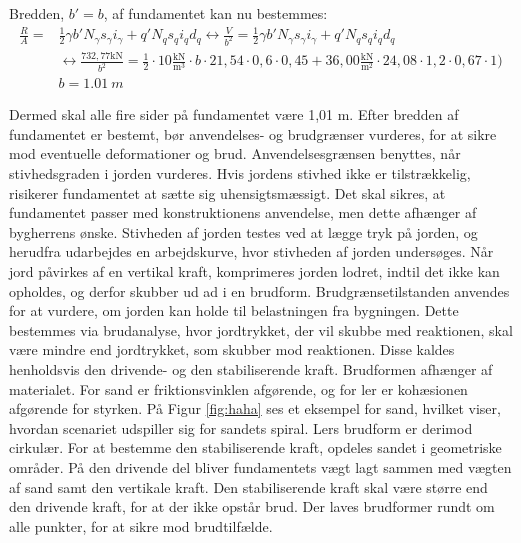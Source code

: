 Bredden, $b'=b$, af fundamentet kan nu bestemmes: 
\begin{equation}
\begin{split}
	\frac{R}{A} = & \frac{1}{2} \gamma b' N_\gamma s_\gamma i_\gamma + q' N_q s_q i_q d_q \leftrightarrow \frac{V}{b^2} = \frac{1}{2} \gamma b' N_\gamma s_\gamma i_\gamma + q' N_q s_q i_q d_q \\ & \leftrightarrow \frac{732,\!77 \text{kN}}{b^2} = \frac{1}{2}\cdot 10 \frac{\text{kN}}{\text{m}^3}\cdot b\cdot 21,\!54\cdot 0,\!6 \cdot 0,\!45 + 36,\!00 \frac{\text{kN}}{\text{m}^2}\cdot 24,\!08 \cdot 1,\!2 \cdot 0,\!67 \cdot 1) \\ & b = \SI{1,01}{m}
\end{split}
\end{equation}

Dermed skal alle fire sider på fundamentet være 1,01 m.
\newline
\newline
Efter bredden af fundamentet er bestemt, bør anvendelses- og brudgrænser vurderes, for at sikre mod eventuelle deformationer og brud. Anvendelsesgrænsen benyttes, når stivhedsgraden i jorden vurderes. Hvis jordens stivhed ikke er tilstrækkelig, risikerer fundamentet at sætte sig uhensigtsmæssigt. Det skal sikres, at fundamentet passer med konstruktionens anvendelse, men dette afhænger af bygherrens ønske. 
\newline \indent{     }  Stivheden af jorden testes ved at lægge tryk på jorden, og herudfra udarbejdes en arbejdskurve, hvor stivheden af jorden undersøges.   
\newline \indent{     }  Når jord påvirkes af en vertikal kraft, komprimeres jorden lodret, indtil det ikke kan opholdes, og derfor skubber ud ad i en brudform. Brudgrænsetilstanden anvendes for at vurdere, om jorden kan holde til belastningen fra bygningen. Dette bestemmes via brudanalyse, hvor jordtrykket, der vil skubbe med reaktionen, skal være mindre end jordtrykket, som skubber mod reaktionen. Disse kaldes henholdsvis den drivende- og den stabiliserende kraft. Brudformen afhænger af materialet. For sand er friktionsvinklen afgørende, og for ler er kohæsionen afgørende for styrken.
\newline \indent{     }  På Figur \ref{fig:haha} ses et eksempel for sand, hvilket viser, hvordan scenariet udspiller sig for sandets spiral. Lers brudform er derimod cirkulær. For at bestemme den stabiliserende kraft, opdeles sandet i geometriske områder. På den drivende del bliver fundamentets vægt lagt sammen med vægten af sand samt den vertikale kraft. Den stabiliserende kraft skal være større end den drivende kraft, for at der ikke opstår brud. Der laves brudformer rundt om alle punkter, for at sikre mod brudtilfælde. 

